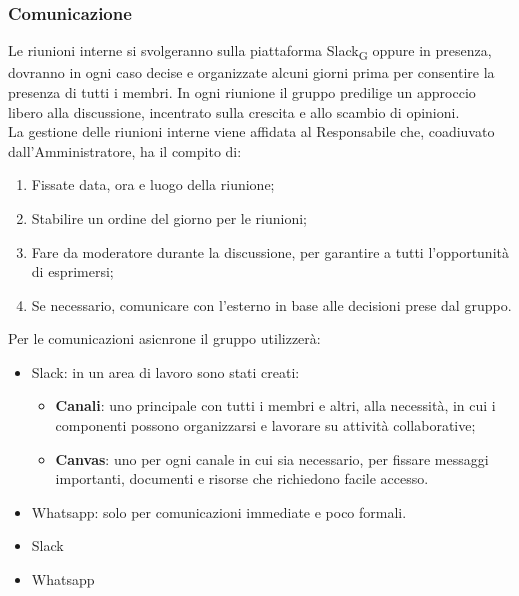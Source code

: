 \subsubsection{Comunicazione}
Le riunioni interne si svolgeranno sulla piattaforma Slack\textsubscript{G} oppure in presenza, dovranno in ogni caso decise e organizzate alcuni giorni prima per consentire la presenza di tutti i membri. In ogni riunione il gruppo predilige un approccio libero alla discussione, incentrato sulla crescita e allo scambio di opinioni. \\
La gestione delle riunioni interne viene affidata al Responsabile che, coadiuvato dall'Amministratore, ha il compito di:
\begin{enumerate}
    \item Fissate data, ora e luogo della riunione;
    \item Stabilire un ordine del giorno per le riunioni;
    \item Fare da moderatore durante la discussione, per garantire a tutti l'opportunità di esprimersi;
    \item Se necessario, comunicare con l'esterno in base alle decisioni prese dal gruppo.
\end{enumerate}
Per le comunicazioni asicnrone il gruppo utilizzerà:
\begin{itemize}
    \item Slack: in un area di lavoro sono stati creati:
            \begin{itemize}
                \item \textbf{Canali}: uno principale con tutti i membri e altri, alla necessità, in cui i componenti possono organizzarsi e lavorare su attività collaborative;
                \item \textbf{Canvas}: uno per ogni canale in cui sia necessario, per fissare messaggi importanti, documenti e risorse che richiedono facile accesso.
            \end{itemize}
    \item Whatsapp: solo per comunicazioni immediate e poco formali.
\end{itemize}
\begin{itemize}
    \item Slack
    \item Whatsapp
\end{itemize}


